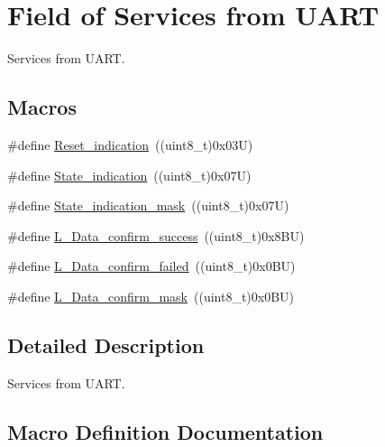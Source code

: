 \hypertarget{group___u_a_r_t___control___from}{}\section{Field of Services from U\+A\+RT}
\label{group___u_a_r_t___control___from}


Services from U\+A\+RT.  


\subsection*{Macros}
\begin{DoxyCompactItemize}
\item 
\#define \hyperlink{group___u_a_r_t___control___from_gade9c58399a01abdaa03bbecbf63879c3}{Reset\+\_\+indication}~((uint8\+\_\+t)0x03\+U)
\item 
\#define \hyperlink{group___u_a_r_t___control___from_ga736e177182335771d7948dd74a7a1a5f}{State\+\_\+indication}~((uint8\+\_\+t)0x07\+U)
\item 
\#define \hyperlink{group___u_a_r_t___control___from_gac1dc46273764bf13be2f30fcc60806a4}{State\+\_\+indication\+\_\+mask}~((uint8\+\_\+t)0x07\+U)
\item 
\#define \hyperlink{group___u_a_r_t___control___from_ga5bef931d5b249bb5d33e68f5262d8ec7}{L\+\_\+\+Data\+\_\+confirm\+\_\+success}~((uint8\+\_\+t)0x8\+B\+U)
\item 
\#define \hyperlink{group___u_a_r_t___control___from_ga6c0c4d47e20c528c12b4cb786930530a}{L\+\_\+\+Data\+\_\+confirm\+\_\+failed}~((uint8\+\_\+t)0x0\+B\+U)
\item 
\#define \hyperlink{group___u_a_r_t___control___from_ga6c0cc536486a2ac5898f3d5b94327ecc}{L\+\_\+\+Data\+\_\+confirm\+\_\+mask}~((uint8\+\_\+t)0x0\+B\+U)
\end{DoxyCompactItemize}


\subsection{Detailed Description}
Services from U\+A\+RT. 



\subsection{Macro Definition Documentation}
